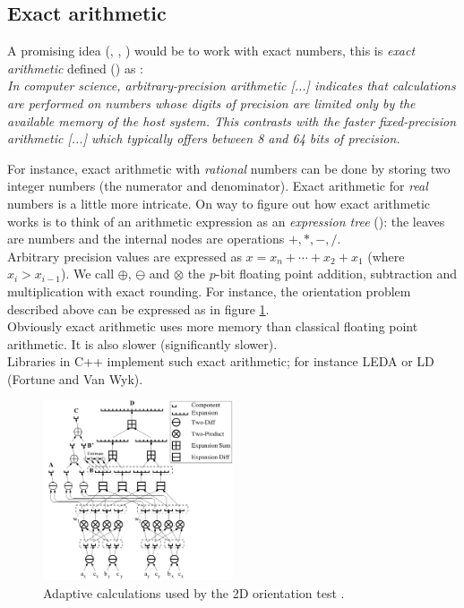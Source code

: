 \subsection{Exact arithmetic}
A promising idea (\cite{bronnimann2000efficient}, \cite{schirra}, \cite{shewchuk1996robust}) would be to work with exact numbers, this is \textit{exact arithmetic} defined (\cite{exactArithmetic}) as : \\
\textit{In computer science, arbitrary-precision arithmetic [...] indicates that calculations are performed on numbers whose digits of precision are limited only by the available memory of the host system. This contrasts with the faster fixed-precision arithmetic [...] which typically offers between 8 and 64 bits of precision.}


For instance, exact arithmetic with \textit{rational} numbers can be done by storing two integer numbers (the numerator and denominator). Exact arithmetic for \textit{real} numbers is a little more intricate. 
On way to figure out how exact arithmetic works is to think of an arithmetic expression as an \textit{expression tree} (\cite{schirra}): the leaves are numbers and the internal nodes are operations $+,*,-,/$. \\
Arbitrary precision values are expressed as $x=x_n + \cdots + x_2 + x_1$ (where $x_i > x_{i-1}$). We call $\oplus$, $\ominus$ and $\otimes$ the $p$-bit floating point addition, subtraction and multiplication with exact rounding.
For instance, the orientation problem described above can be expressed as in figure \ref{fig:ExactArithmetic}.\\

Obviously exact arithmetic uses more memory than classical floating point arithmetic. It is also slower (significantly slower).\\

Libraries in C++ implement such exact arithmetic; for instance LEDA or LD (Fortune and Van Wyk).

\begin{figure}
  \centering
  \includegraphics[width=0.5\textwidth]{images/orientation2d.png}
  \caption{Adaptive calculations used by the 2D orientation test \cite{shewchuk1996robust}.}
  \label{fig:ExactArithmetic}
\end{figure}

